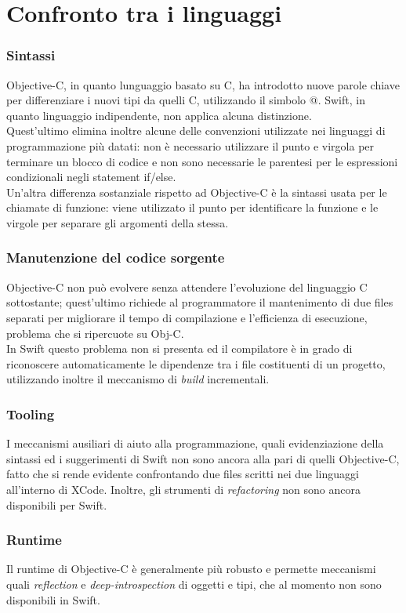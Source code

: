 \chapter{Confronto tra i linguaggi}
\subsection{Sintassi}
Objective-C, in quanto lunguaggio basato su C, ha introdotto nuove parole chiave per differenziare i nuovi tipi da quelli C, utilizzando il simbolo @. Swift, in quanto linguaggio indipendente, non applica alcuna distinzione.\\
Quest'ultimo elimina inoltre alcune delle convenzioni utilizzate nei linguaggi di programmazione più datati: non è necessario utilizzare il punto e virgola per terminare un blocco di codice e non sono necessarie le parentesi per le espressioni condizionali negli statement if/else.\\
Un'altra differenza sostanziale rispetto ad Objective-C è la sintassi usata per le chiamate di funzione: viene utilizzato il punto per identificare la funzione e le virgole per separare gli argomenti della stessa.
\subsection{Manutenzione del codice sorgente}
Objective-C non può evolvere senza attendere l'evoluzione del linguaggio C sottostante; quest'ultimo richiede al programmatore il mantenimento di due files separati per migliorare il tempo di compilazione e l'efficienza di esecuzione, problema che si ripercuote su Obj-C.\\
In Swift questo problema non si presenta ed il compilatore è in grado di riconoscere automaticamente le dipendenze tra i file costituenti di un progetto, utilizzando inoltre il meccanismo di \textit{build} incrementali.
\subsection{Tooling}
I meccanismi ausiliari di aiuto alla programmazione, quali evidenziazione della sintassi ed i suggerimenti di Swift non sono ancora alla pari di quelli Objective-C, fatto che si rende evidente confrontando due files scritti nei due linguaggi all'interno di XCode. Inoltre, gli strumenti di \textit{refactoring} non sono ancora disponibili per Swift.
\subsection{Runtime}
Il runtime di Objective-C è generalmente più robusto e permette meccanismi quali \textit{reflection} e \textit{deep-introspection} di oggetti e tipi, che al momento non sono disponibili in Swift.
